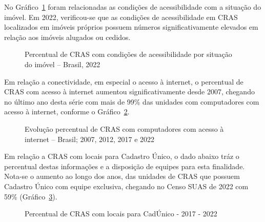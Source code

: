 \documentclass[
  letterpaper,
  DIV=11,
  numbers=noendperiod]{scrreprt}
\begin{document}
No Gráfico~\ref{fig-CRAS-acessibilidade-situacao} foram relacionadas as
condições de acessibilidade com a situação do imóvel. Em 2022,
verificou-se que as condições de acessibilidade em CRAS localizados em
imóveis próprios possuem números significativamente elevados em relação
aos imóveis alugados ou cedidos.

\begin{figure}


\caption{\label{fig-CRAS-acessibilidade-situacao}Percentual de CRAS com
condições de acessibilidade por situação do imóvel -- Brasil, 2022}

\end{figure}%

Em relação a conectividade, em especial o acesso à internet, o
percentual de CRAS com acesso à internet aumentou significativamente
desde 2007, chegando no último ano desta série com mais de 99\% das
unidades com computadores com acesso à internet, conforme o
Gráfico~\ref{fig-CRAS-internet-percentual}.

\begin{figure}


\caption{\label{fig-CRAS-internet-percentual}Evolução percentual de CRAS
com computadores com acesso à internet -- Brasil; 2007, 2012, 2017 e
2022}

\end{figure}%

Em relação a CRAS com locais para Cadastro Único, o dado abaixo tráz o
percentual destas informações e a disposição de equipes para esta
finalidade. Nota-se o aumento ao longo dos anos, das unidades de CRAS
que possuem Cadastro Único com equipe exclusiva, chegando no Censo SUAS
de 2022 com 59\% (Gráfico~\ref{fig-equip-cadunico-cras}).

\begin{figure}


\caption{\label{fig-equip-cadunico-cras}Percentual de CRAS com locais
para CadÚnico - 2017 - 2022}

\end{figure}%
\end{document}

